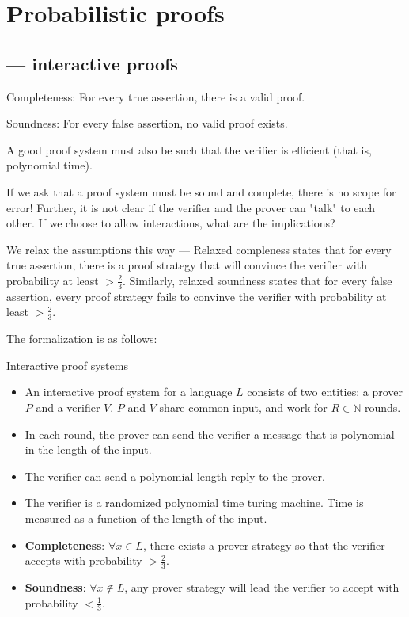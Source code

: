 \newcommand{\gni}{\texttt{GNI }}
\chapter{Probabilistic proofs}

\section{\ip --- interactive proofs}
\begin{definition}
Completeness: For every true assertion, there is a valid proof.
\end{definition}

\begin{definition}
Soundness: For every false assertion, no valid proof exists.
\end{definition}

A good proof system must also be such that the verifier is efficient
(that is, polynomial time).

If we ask that a proof system must be sound and complete, there is no 
scope for error! Further, it is not clear if the verifier and the
prover can "talk" to each other. If we choose to allow interactions, what
are the implications?


We relax the assumptions this way --- Relaxed compleness states that
for every true assertion, there is a
proof strategy that will convince the verifier with probability 
at least $> \frac{2}{3}$.  
Similarly, relaxed soundness states that for every false assertion,
every proof strategy fails to convinve the verifier with probability
at least $> \frac{2}{3}$. 

The formalization is as follows:
\begin{definition}
Interactive proof systems
\begin{itemize}
\item An interactive proof system for a language $L$ consists of two
entities: a prover $P$ and a verifier $V$.
$P$ and $V$ share common input, and work for $R \in \mathbb{N}$ rounds.

\item In each round, the prover can send the verifier a message that 
is polynomial in the length of the input.

\item The verifier can send a polynomial length reply to the prover.

\item The verifier is a randomized polynomial time turing machine. Time
is measured as a function of the length of the input.

\item \textbf{Completeness}: $\forall x \in L$, there exists a prover strategy
so that the verifier accepts with probability $> \frac{2}{3}$.

\item \textbf{Soundness}: $\forall x \notin L$, any prover strategy will lead
the verifier to accept with probability  $< \frac{1}{3}$.
\end{itemize}
\end{definition}

